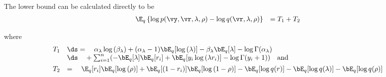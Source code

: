 The lower bound can be calculated directly to be
\[
	\begin{array}{rl}
		\E_q \left\{ \log{p(\vy, \vr, \lambda, \rho)} - \log{q(\vr, \lambda, \rho)} \right\} & = T_1 + T_2 \\
	\end{array}
\]

\noindent where
\[
	\begin{array}{rl}
		T_1 & \ds =                                                                                                                          
		\quad \alpha_\lambda \log{(\beta_\lambda)} + (\alpha_\lambda - 1) \bE_q[\log{(\lambda)}] - \beta_\lambda \bE_q [\lambda] - \log\Gamma(\alpha_\lambda) \\
		    & \ds \quad + \sum_{i=1}^n ( -\bE_q [\lambda] \bE_q [r_i] + \bE_q[y_i \log{(\lambda r_i)}] - \log\Gamma(y_i+1)) \quad \mbox{and} 
		\\ [1ex]
		T_2 & = \quad \E_q[r_i] \bE_q[\log{(\rho)}] + \bE_q[(1 - r_i)] \bE_q[\log{(1 - \rho)}]                                                     
		- \bE_q[\log{q(r)}] 
		- \bE_q[\log{q(\lambda)}] 
		- \bE_q[ \log{q(\rho)}]
	\end{array}
\]

